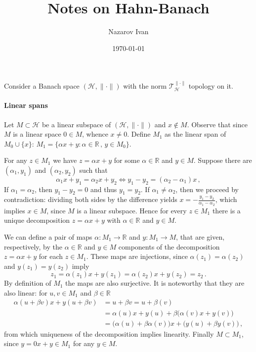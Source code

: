 \documentclass[a4paper]{article}
\title{Notes on Hahn-Banach}
\author{Nazarov Ivan}
\date{\today}
\newcommand{\Hcal}{\mathcal{H}}
\newcommand{\real}{\mathbb{R}}
\newcommand{\Tcal}{\mathcal{T}}
\begin{document}
\maketitle

Consider a Banach space $(\Hcal, \|\cdot\|)$ with the norm $\Tcal^{\|\cdot\|}_\Hcal$
topology on it.

\paragraph{Linear spans} %
\label{par:linear_spans}

Let $M \subset \Hcal$ be a linear subspace of $(\Hcal, \|\cdot\|)$ and $x \notin M$.
Observe that since $M$ is a linear space $0\in M$, whence $x \neq 0$. Define $M_1$
as the linear span of $M_0 \cup \{x\}$: $M_1 = \{\alpha x + y \colon \alpha \in \real
\,,\, y \in M_0\}$.

For any $z\in M_1$ we have $z = \alpha x + y$ for some $\alpha\in \real$ and $y\in M$.
Suppose there are $(\alpha_1, y_1)$ and $(\alpha_2, y_2)$ such that
\begin{equation*}
  \alpha_1 x + y_1 = \alpha_2 x + y_2
  \Leftrightarrow
    y_1 - y_2 = (\alpha_2 - \alpha_1) x
    \,,
\end{equation*}
If $\alpha_1 = \alpha_2$, then $y_1 - y_2 = 0$ and thus $y_1 = y_2$. If $\alpha_1
\neq \alpha_2$, then we proceed by contradiction: dividing both sides by the difference
yields $x = -\tfrac{y_1 - y_2}{\alpha_1 -\alpha_2}$, which implies $x\in M$, since
$M$ is a linear subspace. Hence for every $z\in M_1$ there is a unique decomposition
$z = \alpha x + y$ with $\alpha\in\real$ and $y\in M$.

We can define a pair of maps $\alpha\colon M_1\to \real$ and $y\colon M_1 \to M$,
that are given, respectively, by the $\alpha\in\real$ and $y\in M$ components of
the decomposition $z = \alpha x + y$ for each $z\in M_1$. These maps are injections,
since $\alpha(z_1) = \alpha(z_2)$ and $y(z_1) = y(z_2)$ imply
\begin{equation*}
  z_1 = \alpha(z_1) x + y(z_1)
    = \alpha(z_2) x + y(z_2)
    = z_2
    \,.
\end{equation*}
By definition of $M_1$ the maps are also surjective. It is noteworthy that they are
also linear: for $u, v\in M_1$ and $\beta \in \real$
\begin{align*}
  \alpha(u + \beta v) x + y(u + \beta v)
    &= u + \beta v
    = u + \beta (v)
    \\
    &= \alpha(u) x + y(u)
      + \beta \bigl(\alpha(v) x + y(v) \bigr)
    \\
    &= \bigl( \alpha(u) + \beta\alpha(v) \bigr) x
    + \bigl( y(u) + \beta y(v) \bigr)
    \,,
\end{align*}
from which uniqueness of the decomposition implies linearity. Finally $M\subset M_1$,
since $y = 0 x + y \in M_1$ for any $y\in M$.
\end{document}

